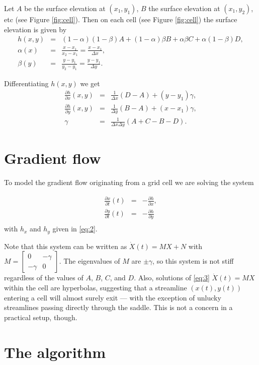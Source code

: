 \documentclass{amsart}
\begin{document}
Let $A$ be the surface elevation at $(x_{1},y_{1})$, $B$ the surface elevation
at $(x_{1}, y_{2})$, etc (see Figure \ref{fig:cell}). Then on each cell (see Figure
\ref{fig:cell}) the surface elevation is given by
\begin{eqnarray}
  \label{eq:1}
  h(x,y) &=& (1-\alpha)(1-\beta)A + (1-\alpha)\beta B + \alpha\beta C +
  \alpha(1-\beta)D,\\
  \alpha(x) &=& \frac{x-x_{1}}{x_{2}-x_{1}} = \frac{x-x_{1}}{\Delta x},\\
  \beta(y) &=& \frac{y-y_{1}}{y_{2}-y_{1}} = \frac{y-y_{1}}{\Delta y}.
\end{eqnarray}

Differentiating $h(x,y)$ we get
\begin{eqnarray}
  \label{eq:2}
  \frac{\partial h}{\partial x}(x,y) &=& \frac{1}{\Delta x}(D-A) + (y-y_{1})
  \gamma,\\
  \frac{\partial h}{\partial y}(x,y) &=& \frac{1}{\Delta y}(B-A) + (x-x_{1})
  \gamma,\\
  \gamma &=& \frac{1}{\Delta x \Delta y}(A + C - B - D).
\end{eqnarray}

\section{Gradient flow}
\label{sec:gradient-flow}

To model the gradient flow originating from a grid cell we are solving the system

\begin{eqnarray}
  \label{eq:3}
  \frac{\partial x}{\partial t}(t) &=& -\frac{\partial h}{\partial x},\\
  \frac{\partial y}{\partial t}(t) &=& -\frac{\partial h}{\partial y}\\
\end{eqnarray}
with $h_{x}$ and $h_{y}$ given in \eqref{eq:2}.

Note that this system can be written as $\dot X(t) = MX + N$ with
$M =
\left[\begin{matrix}
  0 & -\gamma\\
-\gamma & 0
\end{matrix}\right]$.
The eigenvalues of $M$ are $\pm \gamma$, so this system is not stiff regardless
of the values of $A$, $B$, $C$, and $D$. Also, solutions of \eqref{eq:3} $\dot
X(t) = MX$ within the cell are hyperbolas, suggesting that a streamline $(x(t),
y(t))$ entering a cell will almost surely exit --- with the exception of
unlucky streamlines passing directly through the saddle. This is not a concern
in a practical setup, though.

\section{The algorithm}
\label{sec:algorithm}
\end{document}
